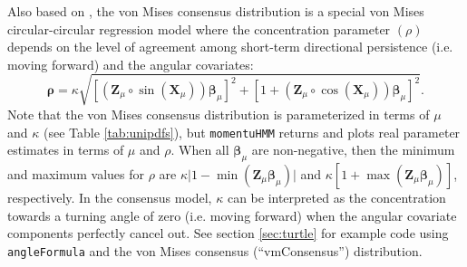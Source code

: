 \documentclass[12pt]{article}\usepackage[]{graphicx}\usepackage[]{color}
\begin{document}
Also based on \cite{RivestEtAl2016}, the von Mises consensus distribution is a special von Mises circular-circular regression model where the concentration parameter $(\rho)$ depends on the level of agreement among short-term directional persistence (i.e. moving forward) and the angular covariates:
\begin{equation}
  {\boldsymbol \rho}=\kappa \sqrt{\left[({\mathbf Z}_\mu \circ \sin({\mathbf X}_\mu)){\boldsymbol \beta}_\mu\right]^2+\left[1+({\mathbf Z}_\mu \circ \cos({\mathbf X}_\mu)){\boldsymbol \beta}_\mu\right]^2}.
  \label{eq:consensus}
\end{equation}
Note that the von Mises consensus distribution is parameterized in terms of $\mu$ and $\kappa$ (see Table \ref{tab:unipdfs}), but \verb|momentuHMM| returns and plots real parameter estimates in terms of $\mu$ and $\rho$. When all ${\boldsymbol \beta}_\mu$ are non-negative, then the minimum and maximum values for $\rho$ are $\kappa \lvert 1-\min({\mathbf Z}_\mu {\boldsymbol \beta}_\mu) \rvert$ and $\kappa \left[1+\max({\mathbf Z}_\mu {\boldsymbol \beta}_\mu)\right]$, respectively.  In the consensus model, $\kappa$ can be interpreted as the concentration towards a turning angle of zero (i.e. moving forward) when the angular covariate components perfectly cancel out. %
See section \ref{sec:turtle} for example code using \verb|angleFormula| and the von Mises consensus (``vmConsensus'') distribution.
\end{document}
